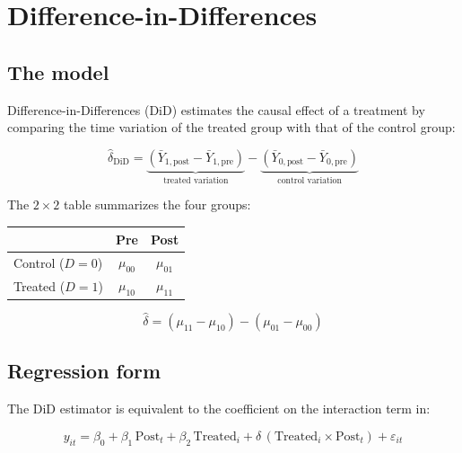 \chapter{Difference-in-Differences}
\label{cap:did}

\section{The model}

Difference-in-Differences (DiD) estimates the causal effect of a treatment
by comparing the time variation of the treated group with that of the control group:

\[
  \hat\delta_{\mathrm{DiD}}
  = \underbrace{(\bar{Y}_{1,\text{post}} - \bar{Y}_{1,\text{pre}})}_{\text{treated variation}}
  - \underbrace{(\bar{Y}_{0,\text{post}} - \bar{Y}_{0,\text{pre}})}_{\text{control variation}}
\]

The $2\times 2$ table summarizes the four groups:

\begin{center}
\begin{tabular}{lcc}
\toprule
 & \textbf{Pre} & \textbf{Post} \\
\midrule
Control ($D=0$) & $\mu_{00}$ & $\mu_{01}$ \\
Treated  ($D=1$) & $\mu_{10}$ & $\mu_{11}$ \\
\bottomrule
\end{tabular}
\end{center}

\[
  \hat\delta = (\mu_{11} - \mu_{10}) - (\mu_{01} - \mu_{00})
\]

\section{Regression form}

The DiD estimator is equivalent to the coefficient on the interaction term in:

\[
  y_{it} = \beta_0 + \beta_1\,\text{Post}_t + \beta_2\,\text{Treated}_i
           + \delta\,(\text{Treated}_i \times \text{Post}_t) + \varepsilon_{it}
\]

